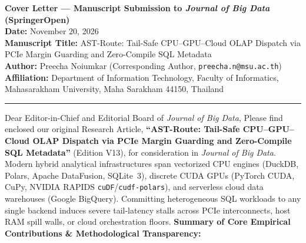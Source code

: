 \documentclass[11pt,a4paper]{article}
\begin{document}
{\large\bfseries Cover Letter --- Manuscript Submission to \textit{Journal of Big Data} (SpringerOpen)}\\[4pt]
\textbf{Date:} November 20, 2026\\
\textbf{Manuscript Title:} AST-Route: Tail-Safe CPU--GPU--Cloud OLAP Dispatch via PCIe Margin Guarding and Zero-Compile SQL Metadata\\
\textbf{Author:} Preecha Noiumkar (Corresponding Author, \texttt{preecha.n@msu.ac.th})\\
\textbf{Affiliation:} Department of Information Technology, Faculty of Informatics, Mahasarakham University, Maha Sarakham 44150, Thailand
\vspace{4pt}\hrule\vspace{8pt}
Dear Editor-in-Chief and Editorial Board of \textit{Journal of Big Data},
Please find enclosed our original Research Article, \textbf{``AST-Route: Tail-Safe CPU--GPU--Cloud OLAP Dispatch via PCIe Margin Guarding and Zero-Compile SQL Metadata''} (Edition V13), for consideration in \textit{Journal of Big Data}. Modern hybrid analytical infrastructures span vectorized CPU engines (DuckDB, Polars, Apache DataFusion, SQLite~3), discrete CUDA GPUs (PyTorch CUDA, CuPy, NVIDIA RAPIDS \texttt{cuDF}/\texttt{cudf-polars}), and serverless cloud data warehouses (Google BigQuery). Committing heterogeneous SQL workloads to any single backend induces severe tail-latency stalls across PCIe interconnects, host RAM spill walls, or cloud orchestration floors.
\textbf{Summary of Core Empirical Contributions \& Methodological Transparency:}
\end{document}

